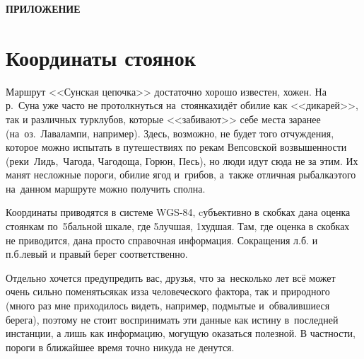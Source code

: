 {
\cleardoublepage
{}
{}
{\hfill\large\textbf{ПРИЛОЖЕНИЕ}}
\section*{Координаты стоянок}
Маршрут <<Сунская цепочка>> достаточно хорошо известен, хожен. На р.\nobreakdash~Суна уже часто не протолкнуться на~стоянках\mdash идёт обилие как <<дикарей>>, так и различных турклубов, которые <<забивают>> себе места заранее (на~оз.\nobreakdash~Лавалампи, например). Здесь, возможно, не будет того отчуждения, которое можно испытать в путешествиях по рекам Вепсовской возвышенности (реки~Лидь,~Чагода, Чагодоща, Горюн, Песь\cite{СоболевВепсскаяЛетопись}), но люди идут сюда не за этим. Их манят несложные пороги, обилие ягод и~грибов, а~также отличная рыбалка\mdash этого на~данном маршруте можно получить сполна. 

Координаты приводятся в системе WGS-84, cубъективно в скобках дана оценка стоянкам по~5\sdash бальной шкале, где 5\mdash лучшая, 1\mdash худшая. Там, где оценка в скобках не приводится, дана просто справочная информация. Сокращения л.б. и п.б.\mdash левый и правый берег соответственно.

Отдельно хочется предупредить вас, друзья, что за~несколько лет всё может очень сильно поменяться\mdash как из\sdash за человеческого фактора, так и природного (много раз мне приходилось видеть, например, подмытые и~обвалившиеся берега), поэтому не стоит воспринимать эти данные как истину в~последней инстанции, а лишь как информацию, могущую оказаться полезной. В частности, пороги в ближайшее время точно никуда не денутся.
%
\newpage 
}
